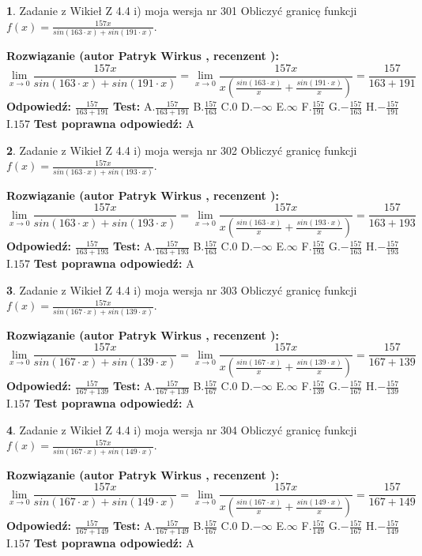 \documentclass[12pt, a4paper]{article}
\theoremstyle{definition} %
\newtheorem{zad}{}
\newcommand{\zadStart}[1]{\begin{zad}#1\newline}
\newcommand{\zadStop}{\end{zad}}
\newcommand{\rozwStart}[2]{\noindent \textbf{Rozwiązanie (autor #1 , recenzent #2): }\newline}
\newcommand{\rozwStop}{\newline}
\newcommand{\odpStart}{\noindent \textbf{Odpowiedź:}\newline}
\newcommand{\odpStop}{\newline}
\newcommand{\testStart}{\noindent \textbf{Test:}\newline}
\newcommand{\testStop}{\newline}
\newcommand{\kluczStart}{\noindent \textbf{Test poprawna odpowiedź:}\newline}
\newcommand{\kluczStop}{\newline}
\begin{document}
\zadStart{Zadanie z Wikieł Z 4.4 i) moja wersja nr 301}
Obliczyć granicę funkcji $f(x)=\frac{157x}{sin(163\cdot x) +sin(191\cdot x)}$.
\zadStop
\rozwStart{Patryk Wirkus}{}
$$\lim\limits_{x\to 0}\frac{157x}{sin(163\cdot x) +sin(191\cdot x)}=\lim\limits_{x\to 0}\frac{157x}{x(\frac{sin(163\cdot x)}{x}+\frac{sin(191\cdot x)}{x})}=\frac{157}{163+191}$$
\rozwStop
\odpStart
$\frac{157}{163+191}$
\odpStop
\testStart
A.$\frac{157}{163+191}$
B.$\frac{157}{163}$
C.$0$
D.$-\infty$
E.$\infty$
F.$\frac{157}{191}$
G.$-\frac{157}{163}$
H.$-\frac{157}{191}$
I.$157$
\testStop
\kluczStart
A
\kluczStop



\zadStart{Zadanie z Wikieł Z 4.4 i) moja wersja nr 302}
Obliczyć granicę funkcji $f(x)=\frac{157x}{sin(163\cdot x) +sin(193\cdot x)}$.
\zadStop
\rozwStart{Patryk Wirkus}{}
$$\lim\limits_{x\to 0}\frac{157x}{sin(163\cdot x) +sin(193\cdot x)}=\lim\limits_{x\to 0}\frac{157x}{x(\frac{sin(163\cdot x)}{x}+\frac{sin(193\cdot x)}{x})}=\frac{157}{163+193}$$
\rozwStop
\odpStart
$\frac{157}{163+193}$
\odpStop
\testStart
A.$\frac{157}{163+193}$
B.$\frac{157}{163}$
C.$0$
D.$-\infty$
E.$\infty$
F.$\frac{157}{193}$
G.$-\frac{157}{163}$
H.$-\frac{157}{193}$
I.$157$
\testStop
\kluczStart
A
\kluczStop



\zadStart{Zadanie z Wikieł Z 4.4 i) moja wersja nr 303}
Obliczyć granicę funkcji $f(x)=\frac{157x}{sin(167\cdot x) +sin(139\cdot x)}$.
\zadStop
\rozwStart{Patryk Wirkus}{}
$$\lim\limits_{x\to 0}\frac{157x}{sin(167\cdot x) +sin(139\cdot x)}=\lim\limits_{x\to 0}\frac{157x}{x(\frac{sin(167\cdot x)}{x}+\frac{sin(139\cdot x)}{x})}=\frac{157}{167+139}$$
\rozwStop
\odpStart
$\frac{157}{167+139}$
\odpStop
\testStart
A.$\frac{157}{167+139}$
B.$\frac{157}{167}$
C.$0$
D.$-\infty$
E.$\infty$
F.$\frac{157}{139}$
G.$-\frac{157}{167}$
H.$-\frac{157}{139}$
I.$157$
\testStop
\kluczStart
A
\kluczStop



\zadStart{Zadanie z Wikieł Z 4.4 i) moja wersja nr 304}
Obliczyć granicę funkcji $f(x)=\frac{157x}{sin(167\cdot x) +sin(149\cdot x)}$.
\zadStop
\rozwStart{Patryk Wirkus}{}
$$\lim\limits_{x\to 0}\frac{157x}{sin(167\cdot x) +sin(149\cdot x)}=\lim\limits_{x\to 0}\frac{157x}{x(\frac{sin(167\cdot x)}{x}+\frac{sin(149\cdot x)}{x})}=\frac{157}{167+149}$$
\rozwStop
\odpStart
$\frac{157}{167+149}$
\odpStop
\testStart
A.$\frac{157}{167+149}$
B.$\frac{157}{167}$
C.$0$
D.$-\infty$
E.$\infty$
F.$\frac{157}{149}$
G.$-\frac{157}{167}$
H.$-\frac{157}{149}$
I.$157$
\testStop
\kluczStart
A
\kluczStop
\end{document}
